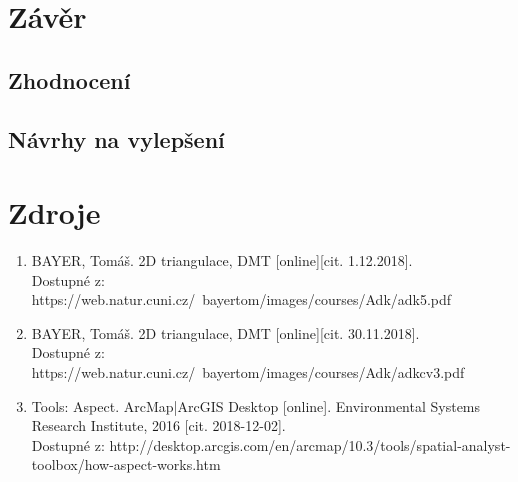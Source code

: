 \documentclass[a4paper, 12pt]{article}
\begin{document}
\section{Závěr}

\subsection{Zhodnocení}

\subsection{Návrhy na vylepšení}


\clearpage
\section{Zdroje}

\begin{enumerate}
\item  BAYER, Tomáš. 2D triangulace, DMT [online][cit. 1.12.2018]. \\
Dostupné z: https://web.natur.cuni.cz/~bayertom/images/courses/Adk/adk5.pdf  \\

\item  BAYER, Tomáš. 2D triangulace, DMT [online][cit. 30.11.2018]. \\
Dostupné z: https://web.natur.cuni.cz/~bayertom/images/courses/Adk/adkcv3.pdf\\

\item Tools: Aspect. ArcMap|ArcGIS Desktop [online]. Environmental Systems Research Institute, 2016 [cit. 2018-12-02]. \\
Dostupné z: http://desktop.arcgis.com/en/arcmap/10.3/tools/spatial-analyst-toolbox/how-aspect-works.htm\\
\end{enumerate}
\end{document}
